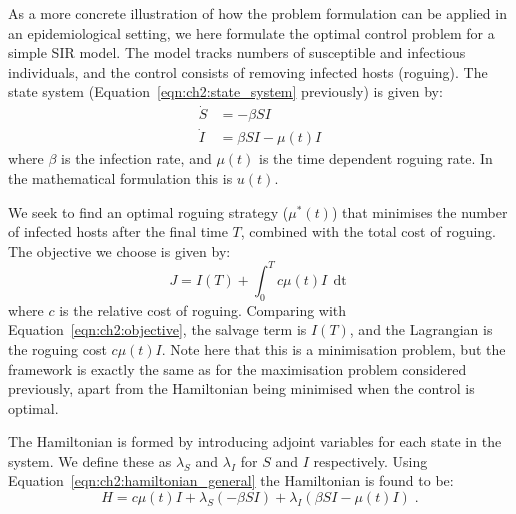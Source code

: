 \begin{example}
    As a more concrete illustration of how the problem formulation can be applied in an epidemiological setting, we here formulate the optimal control problem for a simple SIR model. The model tracks numbers of susceptible and infectious individuals, and the control consists of removing infected hosts (roguing). The state system (Equation~\ref{eqn:ch2:state_system} previously) is given by:
    \begin{subequations}
        \begin{align}
            \dot{S} &= -\beta{}SI\\
            \dot{I} &= \beta{}SI - \mu(t)I
        \end{align}
    \end{subequations}
    where $\beta$ is the infection rate, and $\mu(t)$ is the time dependent roguing rate. In the mathematical formulation this is $u(t)$.

    We seek to find an optimal roguing strategy ($\mu^*(t)$) that minimises the number of infected hosts after the final time $T$, combined with the total cost of roguing. The objective we choose is given by:
    \begin{equation}
        J = I(T) + \int_0^Tc\mu(t)I\,\mathop{dt}
    \end{equation}
    where $c$ is the relative cost of roguing. Comparing with Equation~\ref{eqn:ch2:objective}, the salvage term is $I(T)$, and the Lagrangian is the roguing cost $c\mu(t)I$. Note here that this is a minimisation problem, but the framework is exactly the same as for the maximisation problem considered previously, apart from the Hamiltonian being minimised when the control is optimal.

    The Hamiltonian is formed by introducing adjoint variables for each state in the system. We define these as $\lambda_S$ and $\lambda_I$ for $S$ and $I$ respectively. Using Equation~\ref{eqn:ch2:hamiltonian_general} the Hamiltonian is found to be:
    \begin{equation}\label{eqn:ch2:example_hamiltonian}
        H = c\mu(t)I + \lambda_S(-\beta{}SI) + \lambda_I(\beta{}SI - \mu(t)I)\;.
    \end{equation}


\end{example}
